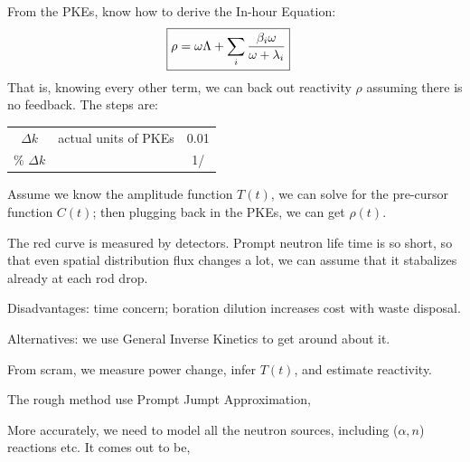 \documentclass{school-22.211-notes}
\begin{document}
\clearpage
{}





\clearpage
{}


From the PKEs, know how to derive the In-hour Equation: 
\begin{align}
\Aboxed{ \rho &= \omega \Lambda + \Sum_i \frac{\beta_i \omega}{\omega + \lambda_i}}
\end{align}
That is, knowing every other term, we can back out reactivity $\rho$ assuming there is no feedback. The steps are: 


\clearpage
{}
\begin{table}[ht]
  \centering
  \begin{tabular}{|c|c|c|}
    $\Delta k$ & actual units of PKEs & 0.01 \\
    \% $\Delta k$ & & 1/%
  \end{tabular}
\end{table}

\clearpage
{}
Assume we know the amplitude function $T(t)$, we can solve for the pre-cursor function $C(t)$; then plugging back in the PKEs, we can get $\rho(t)$. 



\clearpage
{}

The red curve is measured by detectors. Prompt neutron life time is so short, so that even spatial distribution flux changes a lot, we can assume that it stabalizes already at each rod drop. 

Disadvantages: time concern; boration dilution increases cost with waste disposal.  

Alternatives: we use General Inverse Kinetics to get around about it. 

From scram, we measure power change, infer $T(t)$, and estimate reactivity.

The rough method use Prompt Jumpt Approximation,


More accurately, we need to model all the neutron sources, including ($\alpha,n$) reactions etc. It comes out to be, 
\end{document}
